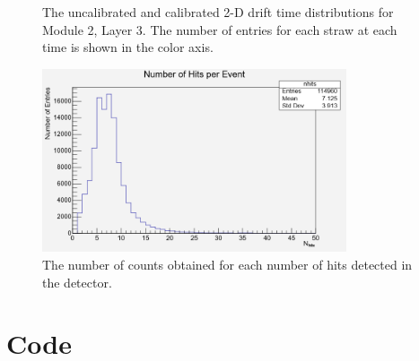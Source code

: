 \documentclass[a4paper]{report}
\numberwithin{equation}{section}
\begin{document}
\begin{figure}[htb!]
	\centering
	\quad
	\centering
	\caption{The uncalibrated and calibrated 2-D drift time 
	distributions for Module 2, Layer 3. The number of entries for each straw at each time is shown in the 
	color axis.}
	\label{fig:calib_drift2d_m2l3}
\end{figure}

\begin{figure}[!h]
	\centering
	\includegraphics[width=0.8\textwidth]{nhits.png}
	\caption{The number of counts obtained for each number of hits detected in the detector. }
	\label{fig:nhits}
\end{figure} \par

\chapter{Code} \label{chap:appendix_code}
\end{document}
